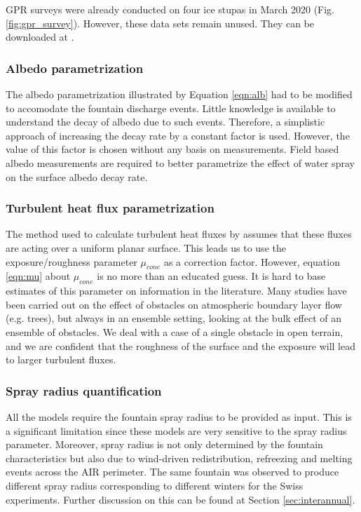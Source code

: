 \ac{GPR} surveys were already conducted on four ice stupas in March 2020 (Fig. \ref{fig:gpr_survey}). However,
these data sets remain unused. They can be downloaded at \citet{balasubramanian_suryanarayanan_2022_7056646}.

\subsubsection{Albedo parametrization}

The albedo parametrization illustrated by Equation \ref{eqn:alb} had to be modified to accomodate the fountain
discharge events. Little knowledge is available to understand the decay of albedo due to such events. Therefore,
a simplistic approach of increasing the decay rate by a constant factor is used. However, the value of this
factor is chosen without any basis on measurements. Field based albedo measurements are required to better
parametrize the effect of water spray on the surface albedo decay rate.

\subsubsection{Turbulent heat flux parametrization}

The method used to calculate turbulent heat fluxes by \citet{garrattAtmosphericBoundaryLayer1992} assumes that
these fluxes are acting over a uniform planar surface. This leads us to use the exposure/roughness parameter
$\mu_{cone}$ as a correction factor. However, equation \ref{eqn:mu} about $\mu_{cone}$ is no more than an
educated guess. It is hard to base estimates of this parameter on information in the literature. Many studies
have been carried out on the effect of obstacles on atmospheric boundary layer flow (e.g. trees), but always in
an ensemble setting, looking at the bulk effect of an ensemble of obstacles. We deal with a case of a single
obstacle in open terrain, and we are confident that the roughness of the surface and the exposure will lead to
larger turbulent fluxes.

\subsubsection{Spray radius quantification}

All the models require the fountain spray radius to be provided as input. This is a significant limitation since
these models are very sensitive to the spray radius parameter. Moreover, spray radius is not only determined by
the fountain characteristics but also due to wind-driven redistribution, refreezing and melting events across
the AIR perimeter. The same fountain was observed to produce different spray radius corresponding to different
winters for the Swiss experiments. Further discussion on this can be found at Section \ref{sec:interannual}.

